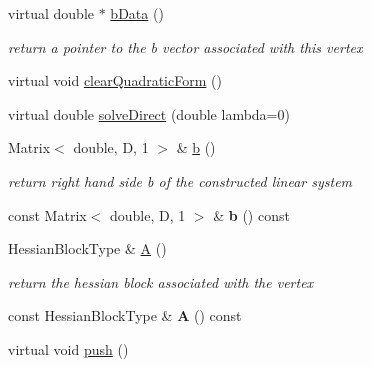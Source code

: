 \begin{DoxyCompactItemize}
\item 
\hypertarget{classg2o_1_1BaseVertex_ac8edea7073e5850c90b0ba37092b8f84}{virtual double $\ast$ \hyperlink{classg2o_1_1BaseVertex_ac8edea7073e5850c90b0ba37092b8f84}{b\-Data} ()}\label{classg2o_1_1BaseVertex_ac8edea7073e5850c90b0ba37092b8f84}

\begin{DoxyCompactList}\small\item\em return a pointer to the b vector associated with this vertex \end{DoxyCompactList}\item 
virtual void \hyperlink{classg2o_1_1BaseVertex_a144f99c7aa36a100dea65b30793e6d76}{clear\-Quadratic\-Form} ()
\item 
virtual double \hyperlink{classg2o_1_1BaseVertex_a0bbd9551b7e03f7e422169e396e8ec9b}{solve\-Direct} (double lambda=0)
\item 
\hypertarget{classg2o_1_1BaseVertex_af7a70ede844ad023ba32edde16c8c745}{Matrix$<$ double, D, 1 $>$ \& \hyperlink{classg2o_1_1BaseVertex_af7a70ede844ad023ba32edde16c8c745}{b} ()}\label{classg2o_1_1BaseVertex_af7a70ede844ad023ba32edde16c8c745}

\begin{DoxyCompactList}\small\item\em return right hand side b of the constructed linear system \end{DoxyCompactList}\item 
\hypertarget{classg2o_1_1BaseVertex_a209c260b9a2730a832270cf3cf7ab605}{const Matrix$<$ double, D, 1 $>$ \& {\bfseries b} () const }\label{classg2o_1_1BaseVertex_a209c260b9a2730a832270cf3cf7ab605}

\item 
\hypertarget{classg2o_1_1BaseVertex_a43bcf2bb3420a0b2cb80bfd297b464a6}{Hessian\-Block\-Type \& \hyperlink{classg2o_1_1BaseVertex_a43bcf2bb3420a0b2cb80bfd297b464a6}{A} ()}\label{classg2o_1_1BaseVertex_a43bcf2bb3420a0b2cb80bfd297b464a6}

\begin{DoxyCompactList}\small\item\em return the hessian block associated with the vertex \end{DoxyCompactList}\item 
\hypertarget{classg2o_1_1BaseVertex_a2f5a9a5bdf0faa43b6082dc3e5a05d45}{const Hessian\-Block\-Type \& {\bfseries A} () const }\label{classg2o_1_1BaseVertex_a2f5a9a5bdf0faa43b6082dc3e5a05d45}

\item 
\hypertarget{classg2o_1_1BaseVertex_ae6edf93fe07aa27579a9352faa83098c}{virtual void \hyperlink{classg2o_1_1BaseVertex_ae6edf93fe07aa27579a9352faa83098c}{push} ()}\label{classg2o_1_1BaseVertex_ae6edf93fe07aa27579a9352faa83098c}


\end{DoxyCompactItemize}
